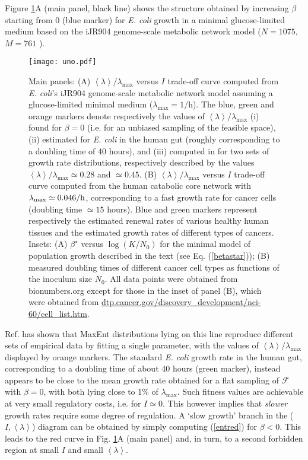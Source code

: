 \documentclass[superscriptaddress,amsmath,amssymb,twocolumn]{revtex4-1}
\newcommand{\avg}[1]{\left\langle #1 \right\rangle}
\begin{document}
Figure \ref{uno}A (main panel, black line) shows the structure obtained by increasing $\beta$ starting from 0 (blue marker) for {\it E. coli} growth in a minimal glucose-limited medium based on the iJR904 genome-scale metabolic network model ($N=1075$, $M=761$ \cite{reed}).
\begin{figure}[t!]
\begin{center}
\texttt{[image: uno.pdf]}
\end{center}
\caption{\label{uno}Main panels: (A) $\avg{\lambda}/\lambda_{\max}$ versus $I$ trade-off curve computed from {\it E. coli}'s iJR904 genome-scale  metabolic network model assuming a glucose-limited minimal medium ($\lambda_{\max}=1/$h). The blue, green and orange markers denote respectively the values of $\avg{\lambda}/\lambda_{\max}$ (i) found for $\beta=0$ (i.e. for an unbiased sampling of the feasible space), (ii) estimated for {\it E. coli} in the human gut (roughly corresponding to a doubling time of 40 hours), and (iii) computed in \cite{physbio} for two sets of growth rate distributions, respectively described by the values $\avg{\lambda}/\lambda_{\max}\simeq 0.28$ and $\simeq 0.45$. (B) $\avg{\lambda}/\lambda_{\max}$ versus $I$ trade-off curve computed from the human catabolic core network with $\lambda_{\max}\simeq 0.046/{\rm h}$, corresponding to a fast growth rate for cancer cells (doubling time $\simeq 15$ hours). Blue and green markers represent respectively the estimated renewal rates of various healthy human tissues and the estimated growth rates of different types of cancers. Insets: (A) $\beta^\star$ versus $\log(K/N_0)$ for the minimal model of population growth described in the text (see Eq. (\ref{betastar})); (B) measured doubling times of different cancer cell types as functions of the inoculum size $N_0$. All data points were obtained from bionumbers.org except for those in the inset of panel (B), which were obtained from  \href{http://dtp.cancer.gov/discovery_development/nci-60/cell_list.htm}{dtp.cancer.gov/discovery\_development/nci-60/cell\_list.htm}.
}
\end{figure}
Ref. \cite{physbio} has shown that MaxEnt distributions lying on this line reproduce different sets of empirical data by fitting a single parameter, with the values of $\avg{\lambda}/\lambda_{\max}$ displayed by orange markers. The standard {\it E. coli} growth rate in the human gut, corresponding to a doubling time of about 40 hours (green marker), instead appears to be close to the mean growth rate obtained for a flat sampling of $\mathcal{F}$ with $\beta=0$, with both lying close to 1\% of $\lambda_{\max}$. Such fitness values are achievable at very small regulatory costs, i.e. for $I\simeq 0$. This however implies that {\it slower} growth rates require some degree of regulation. A `slow growth' branch in the ($I,\avg{\lambda}$) diagram can  be obtained by simply computing (\ref{entred}) for $\beta<0$. This leads to the red curve in Fig. \ref{uno}A (main panel) and, in turn, to a second forbidden region at small $I$ and small $\avg{\lambda}$. 
\end{document}
